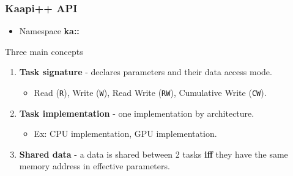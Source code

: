 \begin{frame}[fragile]
  \frametitle{Kaapi++ API}
  \begin{itemize}
  \item Namespace \textbf{ka::}
  \end{itemize}
  \begin{block}{Three main concepts}
    \begin{enumerate}
    \item {\bf Task signature} - declares parameters and their data access mode.
      \begin{itemize}
      \item Read (\verb+R+), Write (\verb+W+), Read Write (\verb+RW+),
	Cumulative Write (\verb+CW+).
      \end{itemize}
    \item {\bf Task implementation} - one implementation by architecture.
      \begin{itemize}
      \item Ex: CPU implementation, GPU implementation.
      \end{itemize}
    \item {\bf Shared data} - a data is shared between 2 tasks \textbf{iff}
      they have the same memory address in effective parameters.
    \end{enumerate}
  \end{block}
\end{frame}
